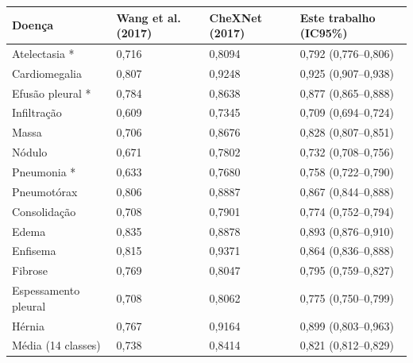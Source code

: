 \begin{tabular}{llll}
\toprule
Doença & Wang et al. (2017) & CheXNet (2017) & Este trabalho (IC95\%) \\
\midrule
Atelectasia * & 0,716 & 0,8094 & 0,792 (0,776–0,806) \\
Cardiomegalia & 0,807 & 0,9248 & 0,925 (0,907–0,938) \\
Efusão pleural * & 0,784 & 0,8638 & 0,877 (0,865–0,888) \\
Infiltração & 0,609 & 0,7345 & 0,709 (0,694–0,724) \\
Massa & 0,706 & 0,8676 & 0,828 (0,807–0,851) \\
Nódulo & 0,671 & 0,7802 & 0,732 (0,708–0,756) \\
Pneumonia * & 0,633 & 0,7680 & 0,758 (0,722–0,790) \\
Pneumotórax & 0,806 & 0,8887 & 0,867 (0,844–0,888) \\
Consolidação & 0,708 & 0,7901 & 0,774 (0,752–0,794) \\
Edema & 0,835 & 0,8878 & 0,893 (0,876–0,910) \\
Enfisema & 0,815 & 0,9371 & 0,864 (0,836–0,888) \\
Fibrose & 0,769 & 0,8047 & 0,795 (0,759–0,827) \\
Espessamento pleural & 0,708 & 0,8062 & 0,775 (0,750–0,799) \\
Hérnia & 0,767 & 0,9164 & 0,899 (0,803–0,963) \\
Média (14 classes) & 0,738 & 0,8414 & 0,821 (0,812–0,829) \\
\bottomrule
\end{tabular}

